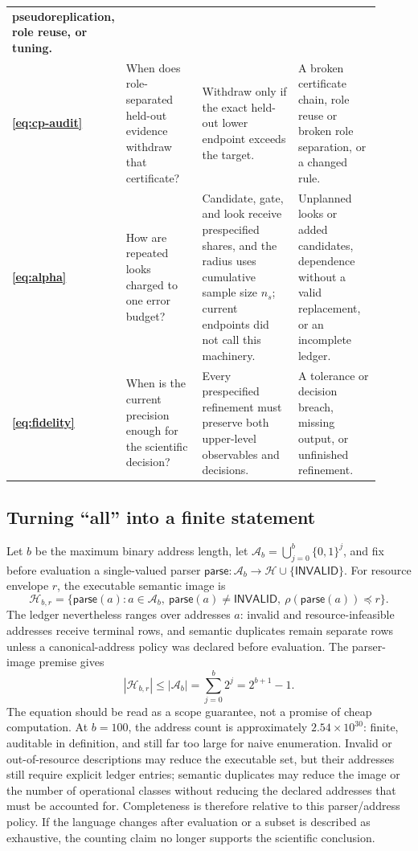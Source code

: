 \documentclass[10pt]{article}
\theoremstyle{definition}
\begin{document}
\begin{longtable}{>{\bfseries}p{0.08\linewidth}p{0.24\linewidth}p{0.34\linewidth}p{0.25\linewidth}}
pseudoreplication, role reuse, or tuning.\\
\eqref{eq:cp-audit} & When does role-separated held-out evidence withdraw that certificate? & Withdraw only if
the exact held-out lower endpoint exceeds the target. & A broken certificate chain, role reuse or
broken role separation, or a changed rule.\\
\eqref{eq:alpha} & How are repeated looks charged to one error budget? & Candidate, gate, and look
receive prespecified shares, and the radius uses cumulative sample size \(n_s\); current endpoints
did not call this machinery. & Unplanned looks or added candidates, dependence without a valid
replacement, or an incomplete ledger.\\
\eqref{eq:fidelity} & When is the current precision enough for the scientific decision? & Every
prespecified refinement must preserve both upper-level observables and decisions. & A tolerance or
decision breach, missing output, or unfinished refinement.\\
\bottomrule
\end{longtable}
\endgroup

\subsection{Turning ``all'' into a finite statement}

Let \(b\) be the maximum binary address length, let
\(\mathcal A_b=\bigcup_{j=0}^{b}\{0,1\}^j\), and fix before evaluation a
single-valued parser
\(\mathsf{parse}:\mathcal A_b\rightarrow\mathcal H\cup\{\mathsf{INVALID}\}\).
For resource envelope \(r\), the executable semantic image is
\[
\mathcal H_{b,r}=\{\mathsf{parse}(a):a\in\mathcal A_b,\
\mathsf{parse}(a)\ne\mathsf{INVALID},\ \rho(\mathsf{parse}(a))\preceq r\}.
\]
The ledger nevertheless ranges over addresses \(a\): invalid and resource-infeasible addresses
receive terminal rows, and semantic duplicates remain separate rows unless a canonical-address
policy was declared before evaluation. The parser-image premise gives
\begin{equation}
|\mathcal H_{b,r}|\le |\mathcal A_b|
=\sum_{j=0}^{b}2^j=2^{b+1}-1.
\label{eq:classcard}
\end{equation}
The equation should be read as a scope guarantee, not a promise of cheap computation. At
\(b=100\), the address count is approximately \(2.54\times10^{30}\): finite, auditable in
definition, and still far too large for naive enumeration. Invalid or out-of-resource
descriptions may reduce the executable set, but their addresses still require explicit ledger
entries; semantic duplicates may reduce the image or the number of operational classes without
reducing the declared addresses that must be accounted for. Completeness is therefore relative to
this parser/address policy. If the language changes after evaluation or a subset is described as
exhaustive, the counting claim no longer supports the scientific conclusion.
\end{document}
